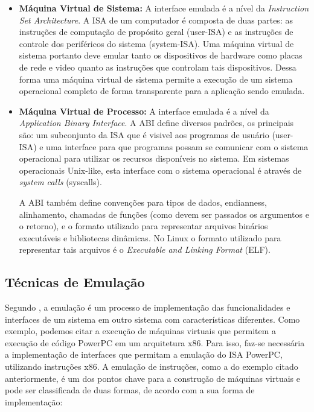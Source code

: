 \documentclass[11pt,twoside]{article}
\begin{document}
\begin{itemize}
	\item \textbf{Máquina Virtual de Sistema:} A interface emulada é a nível da \emph{Instruction Set Architecture}. A ISA de
	um computador é composta de duas partes: as instruções de computação de propósito geral (user-ISA) e as instruções de 
	controle dos periféricos do sistema (system-ISA). Uma máquina virtual de sistema portanto deve emular tanto os dispositivos
	de hardware como placas de rede e video quanto as instruções que controlam tais dispositivos. Dessa forma uma máquina
	virtual de sistema permite a execução de um sistema operacional completo de forma transparente para a aplicação sendo
	emulada. 

	\item \textbf{Máquina Virtual de Processo:} A interface emulada é a nível da \emph{Application Binary Interface}. A ABI  
	define diversos padrões, os principais são: um subconjunto da ISA que é visivel aos programas de usuário (user-ISA) e uma 
	interface para que programas possam se comunicar com o sistema operacional para utilizar os recursos disponíveis no sistema. 
	Em sistemas operacionais Unix-like, esta interface com o sistema operacional é através de \emph{system calls} (syscalls). 

	A ABI também define convenções para tipos de dados, endianness, alinhamento, chamadas de funções (como devem ser passados 
	os argumentos e o retorno), e o formato utilizado para representar arquivos binários executáveis e bibliotecas dinâmicas.
	No Linux o formato utilizado para representar tais arquivos é o \emph{Executable and Linking Format} (ELF).
\end{itemize}


\subsection{Técnicas de Emulação} \label{emulacao}

Segundo \cite{Smith2005}, a emulação é um processo de implementação das funcionalidades e interfaces de um sistema em outro sistema com características diferentes. 
Como exemplo, podemos citar a execução de máquinas virtuais que permitem a execução de código PowerPC em um arquitetura x86. 
Para isso, faz-se necessária a implementação de interfaces que permitam a emulação do ISA PowerPC, utilizando instruções x86.
A emulação de instruções, como a do exemplo citado anteriormente, é um dos pontos chave para a construção de máquinas virtuais e pode ser classificada de duas formas, de acordo com a sua forma de implementação:
\end{document}
